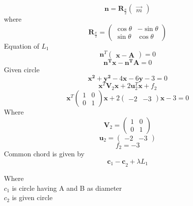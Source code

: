 \documentclass[journal,12pt,twocolumn]{IEEEtran}
\newcommand{\myvec}[1]{\ensuremath{\begin{pmatrix}#1\end{pmatrix}}}
\let\vec\mathbf
\begin{document}
\begin{equation}
    \vec{n} = \vec{R}_{\frac{\pi}{2}} \myvec{\Vec{m}}
\end{equation}
where
    \[ \vec{R}_{\frac{\pi}{2}} = \myvec{\cos  \theta & -\sin \theta \\ \sin \theta & \cos \theta}\]
Equation of $L_1$
\begin{equation}
    \vec{n}^T{\myvec{\vec x-\vec A}}=0
\end{equation}
\begin{equation}
    \vec {n^T x}-\vec {n^TA}=0
\end{equation}
Given circle
\begin{equation}
    \vec{{x}^2+{y}^2}-4{\vec x}-6{\vec y}-3=0
\end{equation}
\begin{equation}
    {\vec{{x}}^T{\vec V}_2{\vec x}+2{\vec u}_2^T{\vec x}}+f_2
\end{equation}
\begin{equation}
   { \vec{{x}}^T{\myvec{1&0\\0&1}}{\vec x}}+2{\myvec{-2&-3}}{\vec x}-3=0
\end{equation}
Where
\begin{equation}
    {\vec V}_2 = {\myvec{1&0\\0&1}}
\end{equation}
\begin{equation}
    {\vec{u}_2}={\myvec{-2&-3}}
\end{equation}
\begin{equation}
    f_2={-3}
\end{equation}
Common chord is given by
\begin{equation}
    {\vec{c}_1-{\vec c}}_2+\lambda{L_1}
\end{equation}

Where\\ $c_1$ is circle having A and B as diameter\\
        $c_2$ is given circle
\end{document}
